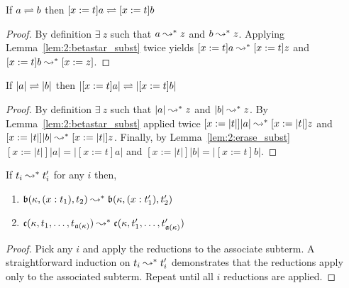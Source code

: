 \begin{lemma}
    If $a \rightleftharpoons b$ then $[x := t]a \rightleftharpoons [x := t]b$
    \label{lem:2:betaconv_subst}
\end{lemma}
\begin{proof}
    By definition $\exists\ z$ such that $a \leadsto^* z$ and $b \leadsto^* z$.
    Applying Lemma~\ref{lem:2:betastar_subst} twice yields $[x := t]a \leadsto^* [x := t]z$ and $[x := t]b \leadsto^* [x := z]$.
\end{proof}

\begin{lemma}
    If $|a| \rightleftharpoons |b|$ then $|[x := t]a| \rightleftharpoons |[x := t]b|$
    \label{lem:2:betaconv_erased_subst}
\end{lemma}
\begin{proof}
    By definition $\exists\ z$ such that $|a| \leadsto^* z$ and $|b| \leadsto^* z$.
    By Lemma~\ref{lem:2:betastar_subst} applied twice $[x := |t|]|a| \leadsto^* [x := |t|]z$ and $[x := |t|]|b| \leadsto^* [x := |t|]z$.
    Finally, by Lemma~\ref{lem:2:erase_subst} $[x := |t|]|a| = |[x := t]a|$ and $[x := |t|]|b| = |[x := t]b|$.
\end{proof}








\begin{lemma}
    If $t_i \leadsto^* t_i^\prime$ for any $i$ then,
    \begin{enumerate}
        \item $\mathfrak{b}(\kappa, (x : t_1), t_2) \leadsto^* \mathfrak{b}(\kappa, (x : t_1^\prime), t_2^\prime)$
        \item $\mathfrak{c}(\kappa, t_1,\ldots,t_{\mathfrak{a}(\kappa)}) \leadsto^* \mathfrak{c}(\kappa, t_1^\prime,\ldots,t_{\mathfrak{a}(\kappa)}^\prime)$
    \end{enumerate}
    \label{lem:2:beta_par}
\end{lemma}
\begin{proof}
    Pick any $i$ and apply the reductions to the associate subterm.
    A straightforward induction on $t_i \leadsto^* t_i^\prime$ demonstrates that the reductions apply only to the associated subterm.
    Repeat until all $i$ reductions are applied.
\end{proof}

